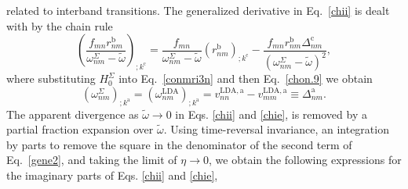 \documentclass[floatfix,prb,aps,superscriptaddress,showpacs,letterpaper]{revtex4}
\begin{document}
related to interband transitions.
The generalized derivative in Eq.~\eqref{chii} is dealt with by the chain rule 
\begin{equation}
\left(\frac{f_{mn}r_{nm}^{\mathrm{b}}}{\omega^\Sigma_{nm}-\tilde\omega}\right)_{;k^{\mathrm{c}}}=
\frac{f_{mn}}{\omega^\Sigma_{nm}-\tilde\omega}\left(r_{nm}^\mathrm{b}\right)_{;k^{\mathrm{c}}}
-\frac{f_{mn}r_{nm}^{\mathrm{b}}\Delta_{nm}^\mathrm{c}}{(\omega^\Sigma_{nm}-\tilde\omega)^2}
,
\label{gene2}
\end{equation}
where substituting $H^\Sigma_0$ 
into Eq.~\eqref{conmri3n} and then
Eq.~\eqref{chon.9}
we obtain
\begin{equation*}
\left(\omega^\Sigma_{nm}\right)_{;k^{\mathrm{a}}}
=
\left(\omega^\mathrm{LDA}_{nm}\right)_{;k^{\mathrm{a}}}
= 
v_{nn}^{\mathrm{LDA},\mathrm{a}}-v_{mm}^{\mathrm{LDA},\mathrm{a}}\equiv\Delta_{nm}^{\mathrm{a}}
.
\end{equation*} 
The apparent divergence as $\tilde\omega\to 0$
in Eqs. \eqref{chii} and \eqref{chie},  
is removed  by
 a partial fraction expansion over $\tilde\omega$. 
Using time-reversal invariance, an integration by parts to 
remove the square in the denominator of the second term of Eq.~\eqref{gene2}, 
and taking the limit of $\eta\to 0$, 
we obtain the following expressions for the imaginary parts of 
Eqs. \eqref{chii} and \eqref{chie}, 
\end{document}
